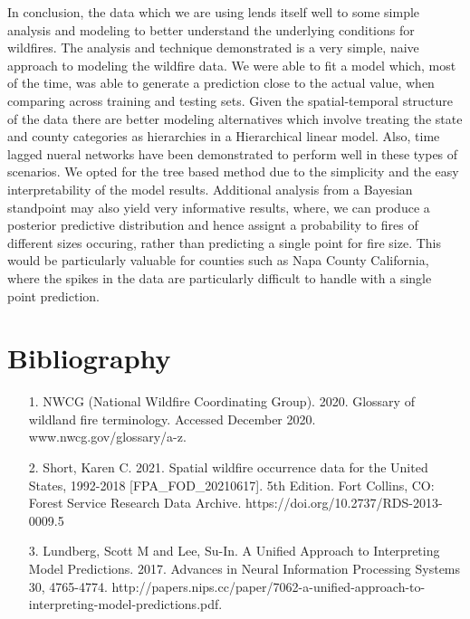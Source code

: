 \documentclass[12pt]{article}
\begin{document}
In conclusion, the data which we are using lends itself well to some simple analysis and modeling to better understand the underlying conditions for wildfires. The analysis and technique demonstrated is a very simple, naive approach to modeling the wildfire data. We were able to fit a model which, most of the time, was able to generate a prediction close to the actual value, when comparing across training and testing sets. Given the spatial-temporal structure of the data there are better modeling alternatives which involve treating the state and county categories as hierarchies in a Hierarchical linear model. Also, time lagged nueral networks have been demonstrated to perform well in these types of scenarios. We opted for the tree based method due to the simplicity and the easy interpretability of the model results. Additional analysis from a Bayesian standpoint may also yield very informative results, where, we can produce a posterior predictive distribution and hence assignt a probability to fires of different sizes occuring, rather than predicting a single point for fire size. This would be particularly valuable for counties such as Napa County California, where the spikes in the data are particularly difficult to handle with a single point prediction. 


\pagebreak

\section*{\textrm{Bibliography}}

\begin{enumerate} 
\item[1.] NWCG (National Wildfire Coordinating Group). 2020. Glossary of wildland fire terminology. Accessed December 2020. www.nwcg.gov/glossary/a-z.


\item[2.] Short, Karen C. 2021. Spatial wildfire occurrence data for the United States, 1992-2018 [FPA\_FOD\_20210617]. 5th Edition. Fort Collins, CO: Forest Service Research Data Archive. https://doi.org/10.2737/RDS-2013-0009.5

\item[3.] Lundberg, Scott M and Lee, Su-In. A Unified Approach to Interpreting Model Predictions. 2017. Advances in Neural Information Processing Systems 30, 4765-4774. http://papers.nips.cc/paper/7062-a-unified-approach-to-interpreting-model-predictions.pdf. 


\end{enumerate}
\end{document}

